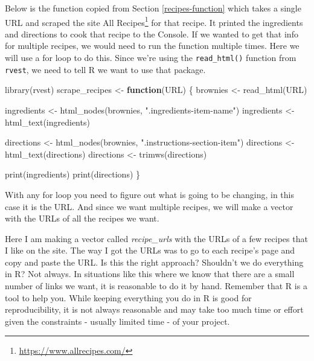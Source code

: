 \documentclass[
  a4paper,
]{krantz}
\makeatletter
\newenvironment{Shaded}{\begin{snugshade}}{\end{snugshade}}
\newcommand{\ControlFlowTok}[1]{\textcolor[rgb]{0.27,0.27,0.27}{\textbf{#1}}}
\newcommand{\FunctionTok}[1]{\textcolor[rgb]{0,0,0}{#1}}
\newcommand{\NormalTok}[1]{#1}
\newcommand{\OtherTok}[1]{\textcolor[rgb]{0.37,0.37,0.37}{#1}}
\newcommand{\StringTok}[1]{\textcolor[rgb]{0.5,0.5,0.5}{#1}}
\renewcommand{\href}[2]{#2\footnote{\url{#1}}}
\newenvironment{kframe}{%
\medskip{}
\setlength{\fboxsep}{.8em}
 \def\at@end@of@kframe{}%
 \ifinner\ifhmode%
  \def\at@end@of@kframe{\end{minipage}}%
  \begin{minipage}{\columnwidth}%
 \fi\fi%
 \def\FrameCommand##1{\hskip\@totalleftmargin \hskip-\fboxsep
 \colorbox{shadecolor}{##1}\hskip-\fboxsep
     \hskip-\linewidth \hskip-\@totalleftmargin \hskip\columnwidth}%
 \MakeFramed {\advance\hsize-\width
   \@totalleftmargin\z@ \linewidth\hsize
   \@setminipage}}%
 {\par\unskip\endMakeFramed%
 \at@end@of@kframe}
\renewenvironment{Shaded}{\begin{kframe}}{\end{kframe}}
\makeatother
\begin{document}
Below is the function copied from Section
\ref{recipes-function} which takes a single URL and scraped
the site \href{https://www.allrecipes.com/}{All Recipes} for
that recipe. It printed the ingredients and directions to
cook that recipe to the Console. If we wanted to get that
info for multiple recipes, we would need to run the function
multiple times. Here we will use a for loop to do this.
Since we're using the \texttt{read\_html()} function from
\texttt{rvest}, we need to tell R we want to use that
package.

\begin{Shaded}
\begin{Highlighting}[]
\FunctionTok{library}\NormalTok{(rvest)}
\NormalTok{scrape\_recipes }\OtherTok{\textless{}{-}} \ControlFlowTok{function}\NormalTok{(URL) \{}
\NormalTok{  brownies }\OtherTok{\textless{}{-}} \FunctionTok{read\_html}\NormalTok{(URL)}

\NormalTok{  ingredients }\OtherTok{\textless{}{-}} \FunctionTok{html\_nodes}\NormalTok{(brownies, }\StringTok{".ingredients{-}item{-}name"}\NormalTok{)}
\NormalTok{  ingredients }\OtherTok{\textless{}{-}} \FunctionTok{html\_text}\NormalTok{(ingredients)}

\NormalTok{  directions }\OtherTok{\textless{}{-}} \FunctionTok{html\_nodes}\NormalTok{(brownies, }\StringTok{".instructions{-}section{-}item"}\NormalTok{)}
\NormalTok{  directions }\OtherTok{\textless{}{-}} \FunctionTok{html\_text}\NormalTok{(directions)}
\NormalTok{  directions }\OtherTok{\textless{}{-}} \FunctionTok{trimws}\NormalTok{(directions)}

  \FunctionTok{print}\NormalTok{(ingredients)}
  \FunctionTok{print}\NormalTok{(directions)}
\NormalTok{\}}
\end{Highlighting}
\end{Shaded}

With any for loop you need to figure out what is going to be
changing, in this case it is the URL. And since we want
multiple recipes, we will make a vector with the URLs of all
the recipes we want.

Here I am making a vector called \emph{recipe\_urls} with
the URLs of a few recipes that I like on the site. The way I
got the URLs was to go to each recipe's page and copy and
paste the URL. Is this the right approach? Shouldn't we do
everything in R? Not always. In situations like this where
we know that there are a small number of links we want, it
is reasonable to do it by hand. Remember that R is a tool to
help you. While keeping everything you do in R is good for
reproducibility, it is not always reasonable and may take
too much time or effort given the constraints - usually
limited time - of your project.
\end{document}
